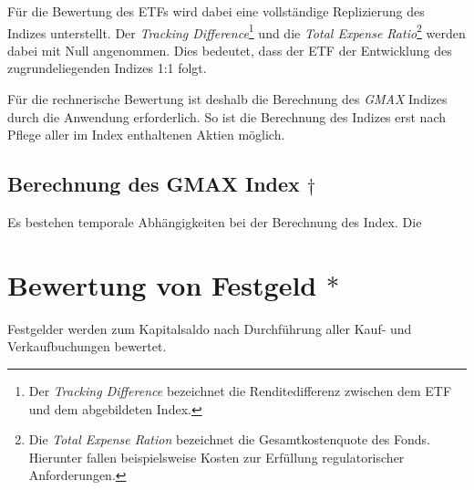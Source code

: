 \documentclass[12pt, a4paper]{article}
\begin{document}
Für die Bewertung des ETFs wird dabei eine vollständige Replizierung des Indizes unterstellt.
Der \textit{Tracking Difference}\footnote{Der \textit{Tracking Difference} bezeichnet die Renditedifferenz zwischen dem ETF und dem abgebildeten Index.} und die \textit{Total Expense Ratio}\footnote{Die \textit{Total Expense Ration} bezeichnet die Gesamtkostenquote des Fonds. Hierunter fallen beispielsweise Kosten zur Erfüllung regulatorischer Anforderungen.} werden dabei mit Null angenommen.
Dies bedeutet, dass der ETF der Entwicklung des zugrundeliegenden Indizes 1:1 folgt.


Für die rechnerische Bewertung ist deshalb die Berechnung des \textit{GMAX} Indizes durch die Anwendung erforderlich. So ist die Berechnung des Indizes erst nach Pflege aller im Index enthaltenen Aktien möglich.

\subsection{Berechnung des {GMAX} Index $\dagger$}

Es bestehen temporale Abhängigkeiten bei der Berechnung des Index. Die 



\section{Bewertung von Festgeld $\ast$}
\label{sec:bewertung_von_festgeldern}


Festgelder werden zum Kapitalsaldo nach Durchführung aller Kauf- und Verkaufbuchungen bewertet.

\end{document}
